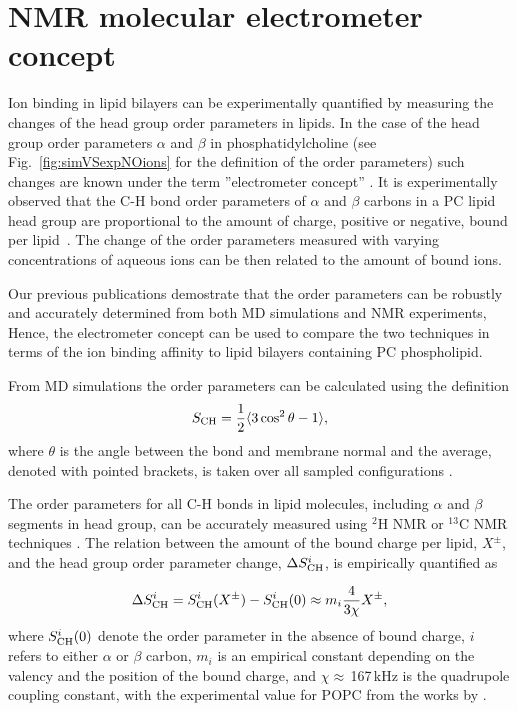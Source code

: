 

\section{NMR molecular electrometer concept} \label{section:electrometer} 

Ion binding in lipid bilayers can be experimentally quantified
by measuring the changes of the head group order parameters in lipids.
In the case of the head group order parameters $\alpha$ and $\beta$ in phosphatidylcholine
(see Fig.~\ref{fig:simVSexpNOions} for the definition of the order parameters)
such changes are known under the term ''electrometer concept'' \citet{seelig87,catte16}. 
It is experimentally observed that the C-H bond
order parameters of $\alpha$ and $\beta$ carbons in a PC lipid head group
are proportional to the amount of charge, positive or negative, bound per lipid~\citep{seelig87}.
The change of the order parameters measured with varying concentrations of aqueous ions 
can be then related to the amount of bound ions.

Our previous publications \citep{catte16,ollila16} demostrate that
the order parameters can be robustly and accurately determined from both MD simulations and  NMR experiments, 
Hence, the electrometer concept can be used to compare the two techniques
in terms of the ion binding affinity to lipid bilayers containing PC phospholipid. 

From MD simulations the order parameters can be calculated using the definition
\begin{equation}\label{OP} 
S_{\rm CH}=\frac{1}{2}\langle 3\cos^2\theta -1 \rangle, 
\end{equation} 
where $\theta$ is the angle between the bond and membrane
normal and the average, denoted with pointed brackets, is taken over all sampled configurations \citep{ollila16}.

The order parameters for all C-H bonds in lipid molecules, including
$\alpha$ and $\beta$ segments in head group, can be accurately measured
using $^2$H NMR or $^{13}$C NMR techniques \citep{ollila16}. 
The relation between the amount of the bound charge per lipid,  $X^\pm$, and
the head group order parameter change, $\Delta S_{\rm{CH}}^{i}$,
is empirically quantified as~\citep{seelig87,ferreira16}

\begin{equation}\label{OPchangeEQ} 
\Delta S_{\rm{CH}}^{i}= S_{\rm{CH}}^{i}(X^\pm)-S_{\rm{CH}}^{i}(0) \approx m_i \frac{4 }{3\chi}X^\pm, 
\end{equation} 
where $S_{\rm{CH}}^{i}(0)$ denote the order parameter in the absence of bound charge,
$i$ refers to either $\alpha$ or $\beta$ carbon,
$m_i$ is an empirical constant depending on the valency and the position of the bound charge,
and $\chi \approx$\,167\,kHz is the quadrupole coupling constant, 
with the experimental value for POPC from the works by \citet{seelig77,Davis83}.

